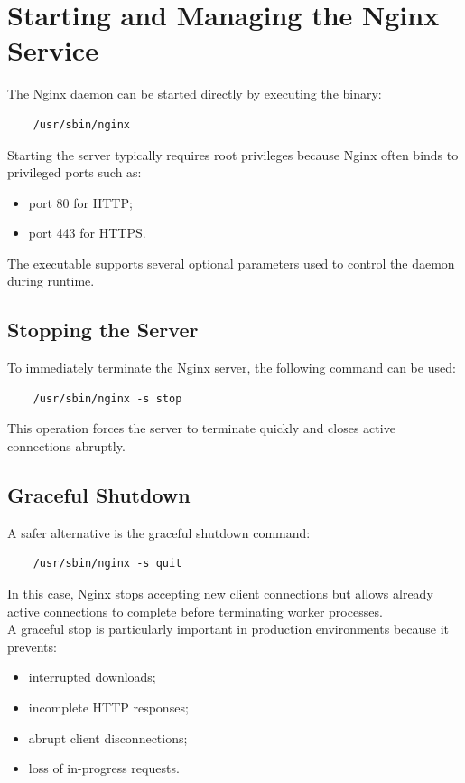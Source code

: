 \documentclass{scrbook}
\begin{document}
	\section{Starting and Managing the Nginx Service}
	
	The Nginx daemon can be started directly by executing the binary:
	
	\begin{verbatim}
	/usr/sbin/nginx
	\end{verbatim}
	
	Starting the server typically requires root privileges because Nginx often binds to privileged ports such as:
	\begin{itemize}
		\item port 80 for HTTP;
		\item port 443 for HTTPS.
	\end{itemize}
	
	The executable supports several optional parameters used to control the daemon during runtime.
	
	\subsection{Stopping the Server}
	
	To immediately terminate the Nginx server, the following command can be used:
	
	\begin{verbatim}
	/usr/sbin/nginx -s stop
	\end{verbatim}
	
	This operation forces the server to terminate quickly and closes active connections abruptly.
	
	\subsection{Graceful Shutdown}
	
	A safer alternative is the graceful shutdown command:
	
	\begin{verbatim}
	/usr/sbin/nginx -s quit
	\end{verbatim}
	
	In this case, Nginx stops accepting new client connections but allows already active connections to complete before terminating worker processes.\\
	
	A graceful stop is particularly important in production environments because it prevents:
	\begin{itemize}
		\item interrupted downloads;
		\item incomplete HTTP responses;
		\item abrupt client disconnections;
		\item loss of in-progress requests.
	\end{itemize}
	
\end{document}
